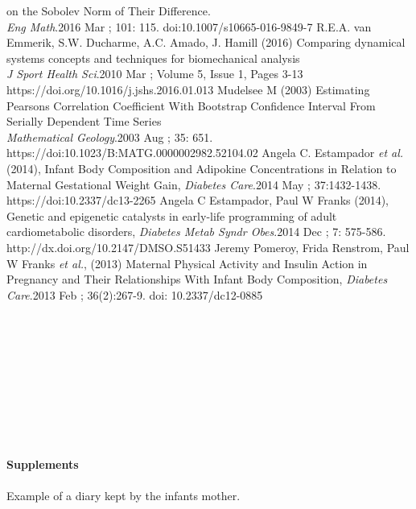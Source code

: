 \documentclass{article}
\begin{document}
\begin{thebibliography}{99}
on the Sobolev Norm of Their Difference.\\
\textit{Eng Math}.2016 Mar ; 101: 115. doi:10.1007/s10665-016-9849-7
R.E.A. van Emmerik, S.W. Ducharme, A.C. Amado, J. Hamill (2016) Comparing dynamical systems concepts and techniques for biomechanical analysis\\ 
\textit{J Sport Health Sci}.2010 Mar ; Volume 5, Issue 1, Pages 3-13 https://doi.org/10.1016/j.jshs.2016.01.013
Mudelsee M (2003) Estimating Pearsons Correlation Coefficient With Bootstrap Confidence Interval From Serially
Dependent Time Series\\
\textit{Mathematical Geology}.2003 Aug ; 35: 651. https://doi:10.1023/B:MATG.0000002982.52104.02
Angela C. Estampador \textit{et al.} (2014), Infant Body Composition and Adipokine Concentrations in Relation to Maternal Gestational Weight Gain,
\textit{Diabetes Care}.2014 May ; 37:1432-1438. https://doi:10.2337/dc13-2265
Angela C Estampador, Paul W Franks (2014), Genetic and epigenetic catalysts in early-life programming of adult cardiometabolic disorders, 
\textit{Diabetes Metab Syndr Obes}.2014 Dec ; 7: 575-586.  http://dx.doi.org/10.2147/DMSO.S51433
Jeremy Pomeroy, Frida Renstrom, Paul W Franks \textit{et al.}, (2013) Maternal Physical Activity and Insulin Action in Pregnancy and Their Relationships With Infant Body Composition, 
\textit{Diabetes Care}.2013 Feb ; 36(2):267-9. doi: 10.2337/dc12-0885
\end{thebibliography}
\\
\\
\\
\\
\\
\\
\\
\\
\\
\Large{\textbf{Supplements}}
\\
\\
\normalsize Example of a diary kept by the infants mother.

\end{document}

